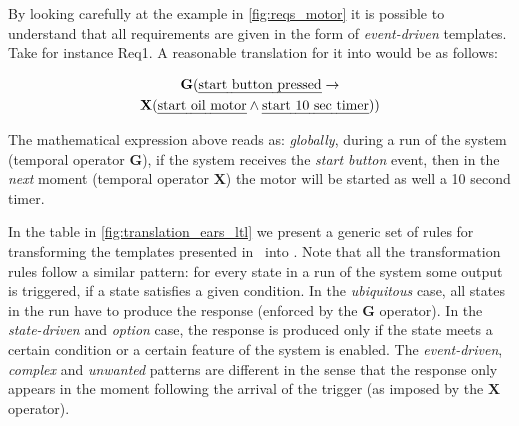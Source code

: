 By looking carefully at the example in \fig\ref{fig:reqs_motor} it is possible
to understand that all requirements are given in the form of \ears
\emph{event-driven} templates. Take for instance \textsf{Req1}. A
reasonable translation for it into \ltl would be as follows:

\begin{multline*}
\mathbf{G}(\text{\emph{start button pressed}} \rightarrow\\
\mathbf{X}(\text{\emph{start oil motor}}\land \text{\emph{start 10 sec timer}}))
\end{multline*}


The mathematical expression above reads as: \emph{globally},
during a run of the system (temporal operator $\mathbf{G}$), if the system
receives the \emph{start button} event, then in the \emph{next} moment
(temporal operator $\mathbf{X}$) the motor will be started as well a 10 second timer.

In the table in \fig\ref{fig:translation_ears_ltl} we present a generic set of
rules for transforming the \ears templates presented in~\cite{EARS09} into \ltl.
Note that all the transformation rules follow a similar pattern: for every state
in a run of the system some output is triggered, if a state satisfies a given
condition. In the \emph{ubiquitous} case, all states in the run have to produce
the response (enforced by the $\mathbf{G}$ operator). In the \emph{state-driven}
and \emph{option} case, the response is produced only if the state meets a
certain condition or a certain feature of the system is enabled.
The \emph{event-driven}, \emph{complex} and \emph{unwanted} patterns
are different in the sense that the response only appears in the moment
following the arrival of the trigger (as imposed by the $\mathbf{X}$ operator).
